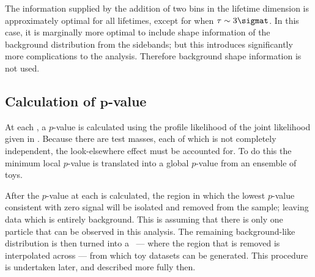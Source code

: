 The information supplied by the addition of two bins in the lifetime dimension is approximately
optimal for all \db lifetimes, except for when $\tau\sim3\sigmat$.
In this case, it is marginally more optimal to include shape information of the background
distribution from the sidebands; but this introduces
significantly more complications to the analysis.
Therefore background shape information is not used.


\subsection[Calculation of $p$-value]
{Calculation of $\boldsymbol{p}$-value}
\label{sec:db:pval}
At each , a $p$-value is calculated using the profile likelihood of the joint likelihood
given in .
Because there are  test masses, each of which is
not completely independent, the look-elsewhere effect must be accounted for.
To do this the minimum local $p$-value is translated into a global $p$-value from an ensemble of toys.

After the $p$-value at each  is calculated, the region in which the lowest $p$-value
consistent with zero signal will be isolated and removed from the sample; leaving data
which is entirely background.
This is assuming that there is only one \np particle that can be observed in this analysis.
The remaining background-like distribution is then turned into a \PDF\ --- where the region that is
removed is interpolated across --- from which toy datasets can be generated.
This procedure is undertaken later, and described more fully then.

